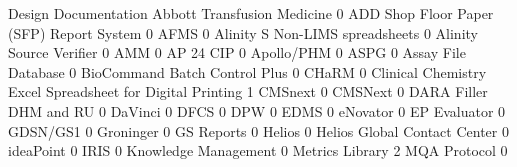 \documentclass{article}
\begin{document}
\begin{Schunk}
\begin{Soutput}
                                                            Design Documentation
  Abbott Transfusion Medicine                                                  0
  ADD Shop Floor Paper (SFP) Report System                                     0
  AFMS                                                                         0
  Alinity S Non-LIMS spreadsheets                                              0
  Alinity Source Verifier                                                      0
  AMM                                                                          0
  AP 24 CIP                                                                    0
  Apollo/PHM                                                                   0
  ASPG                                                                         0
  Assay File Database                                                          0
  BioCommand Batch Control Plus                                                0
  CHaRM                                                                        0
  Clinical Chemistry Excel Spreadsheet for Digital Printing                    1
  CMSnext                                                                      0
  CMSNext                                                                      0
  DARA Filler DHM and RU                                                       0
  DaVinci                                                                      0
  DFCS                                                                         0
  DPW                                                                          0
  EDMS                                                                         0
  eNovator                                                                     0
  EP Evaluator                                                                 0
  GDSN/GS1                                                                     0
  Groninger                                                                    0
  GS Reports                                                                   0
  Helios                                                                       0
  Helios Global Contact Center                                                 0
  ideaPoint                                                                    0
  IRIS                                                                         0
  Knowledge Management                                                         0
  Metrics Library                                                              2
  MQA Protocol                                                                 0

\end{Soutput}
\end{Schunk}
\end{document}
